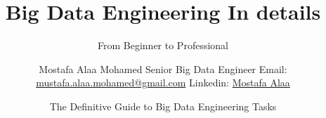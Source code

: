 \title[Big Data Engineering In details] %
{Big Data Engineering In details}

\subtitle{From Beginner to Professional}

\author[Mostafa Alaa] %
{Mostafa Alaa Mohamed \newline Senior Big Data Engineer \newline Email: \href{mailto: mustafa.alaa.mohamed@gmail.com}{mustafa.alaa.mohamed@gmail.com} \newline Linkedin: \href{https://www.linkedin.com/in/mostafa-alaa-5120615b/}{Mostafa Alaa} }



\date[\today] %
{The Definitive Guide to Big Data Engineering Tasks}




